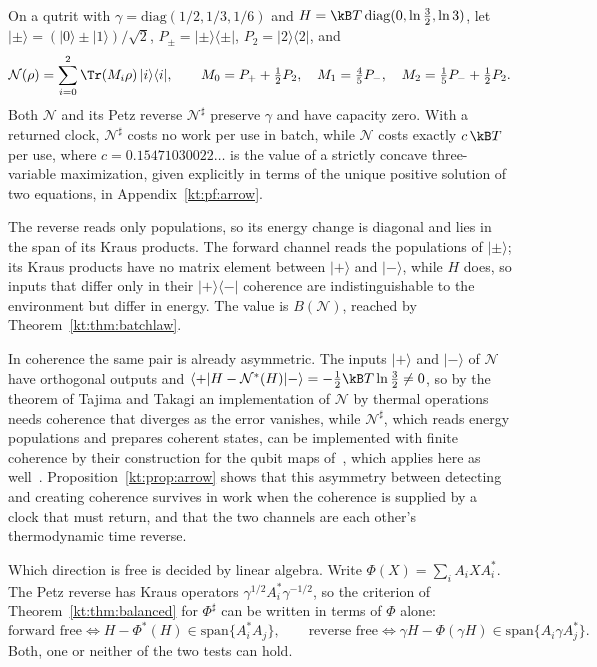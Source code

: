 \begin{proposition}\label{kt:prop:arrow}\leavevmode\\
On a qutrit with $\gamma=\mathrm{diag}(1/2,1/3,1/6)$ and $H=\kB T\,\mathrm{diag}(0,\ln\tfrac32,\ln3)$, let $|\pm\rangle=(|0\rangle\pm|1\rangle)/\sqrt2$, $P_\pm=|\pm\rangle\langle\pm|$, $P_2=|2\rangle\langle2|$, and
\[
\mathcal N(\rho)=\sum_{i=0}^2\Tr(M_i\rho)\,|i\rangle\langle i|,\qquad M_0=P_++\tfrac12P_2,\quad M_1=\tfrac45P_-,\quad M_2=\tfrac15P_-+\tfrac12P_2.
\]
Both $\mathcal N$ and its Petz reverse $\mathcal N^\sharp$ preserve $\gamma$ and have capacity zero. With a returned clock, $\mathcal N^\sharp$ costs no work per use in batch, while $\mathcal N$ costs exactly $c\,\kB T$ per use, where $c=0.15471030022\ldots$ is the value of a strictly concave three-variable maximization, given explicitly in terms of the unique positive solution of two equations, in Appendix~\ref{kt:pf:arrow}.
\end{proposition}

The reverse reads only populations, so its energy change is diagonal and lies in the span of its Kraus products. The forward channel reads the populations of $|\pm\rangle$; its Kraus products have no matrix element between $|+\rangle$ and $|-\rangle$, while $H$ does, so inputs that differ only in their $|+\rangle\langle-|$ coherence are indistinguishable to the environment but differ in energy. The value is $B(\mathcal N)$, reached by Theorem~\ref{kt:thm:batchlaw}.

In coherence the same pair is already asymmetric. The inputs $|+\rangle$ and $|-\rangle$ of $\mathcal N$ have orthogonal outputs and $\langle+|H-\mathcal N^*(H)|-\rangle=-\tfrac12\kB T\ln\tfrac32\neq0$, so by the theorem of Tajima and Takagi an implementation of $\mathcal N$ by thermal operations needs coherence that diverges as the error vanishes, while $\mathcal N^\sharp$, which reads energy populations and prepares coherent states, can be implemented with finite coherence by their construction for the qubit maps of~\cite{FOR15}, which applies here as well~\cite[Suppl.\ Sec.~IV]{TajimaTakagi25}. Proposition~\ref{kt:prop:arrow} shows that this asymmetry between detecting and creating coherence survives in work when the coherence is supplied by a clock that must return, and that the two channels are each other's thermodynamic time reverse.

Which direction is free is decided by linear algebra. Write $\Phi(X)=\sum_iA_iXA_i^*$. The Petz reverse has Kraus operators $\gamma^{1/2}A_i^*\gamma^{-1/2}$, so the criterion of Theorem~\ref{kt:thm:balanced} for $\Phi^\sharp$ can be written in terms of $\Phi$ alone:
\[
\text{forward free}\iff H-\Phi^*(H)\in\mathrm{span}\{A_i^*A_j\},\qquad
\text{reverse free}\iff \gamma H-\Phi(\gamma H)\in\mathrm{span}\{A_i\gamma A_j^*\}.
\]
Both, one or neither of the two tests can hold.

